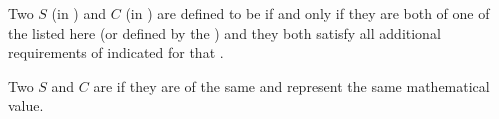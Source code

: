 % 
%  

% 
% 
% 
% 


Two  $S$ (in ) and $C$ (in )
     are defined to be  if and only if 
     they are both of one of the  listed here
      (or defined by the ) 
 and they both satisfy all additional requirements of  
      indicated for that .

\beginlist

 
Two  $S$ and $C$ are  if they are of the same 
and represent the same mathematical value.

 

